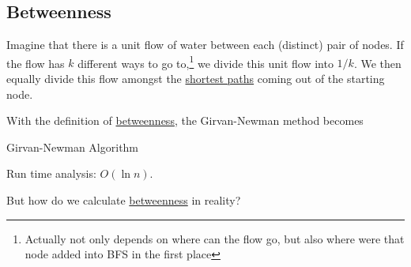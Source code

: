 \subsection{Betweenness}
\begin{definition}[Betweenness]\label{def:betweenness}
	Imagine that there is a unit flow of water between each (distinct) pair of nodes. If the flow has \(k\) different ways to go to,\footnote{Actually not only depends on where can the flow go, but also where were that node added into BFS in the first place}
	we divide this unit flow into \(1/k\). We then equally divide this flow amongst the \hyperref[def:shortest-path]{shortest paths} coming out of the starting node.
\end{definition}

With the definition of \hyperref[def:betweenness]{betweenness}, the Girvan-Newman method becomes


\par
\begin{algorithm}[H]\label{algo:Girvan-Newman-algorithm}
	\DontPrintSemicolon
	\caption{Girvan-Newman Algorithm}
	\BlankLine

	\;
	\Return{}\;
\end{algorithm}

\begin{remark}
	Run time analysis: \(O(\ln n)\).
\end{remark}

\begin{problem}
But how do we calculate \hyperref[def:betweenness]{betweenness} in reality?
\end{problem}

